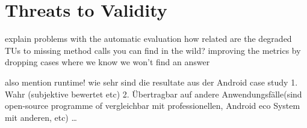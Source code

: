 \section{Threats to Validity}

explain problems with the automatic evaluation
how related are the degraded TUs to missing method calls you can find in the wild?
improving the metrics by dropping cases where we know we won't find an answer

also mention runtime!
wie sehr sind die resultate aus der Android case study 1. Wahr (subjektive bewertet etc) 2. Übertragbar auf andere Anwendungsfälle(sind open-source programme of vergleichbar mit professionellen, Android eco System mit anderen, etc)
\ldots
